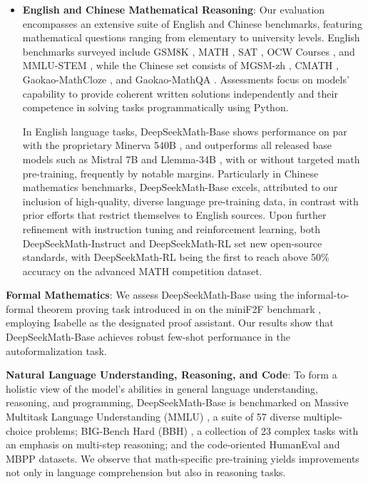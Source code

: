 \begin{itemize}[topsep=0pt]
    \item \textbf{English and Chinese Mathematical Reasoning}: Our evaluation encompasses an extensive suite of English and Chinese benchmarks, featuring mathematical questions ranging from elementary to university levels. English benchmarks surveyed include GSM8K \citep{gsm8k}, MATH \citep{MATH}, SAT \citep{llemma}, OCW Courses \citep{minerva}, and MMLU-STEM \citep{mmlu}, while the Chinese set consists of MGSM-zh \citep{mgsm}, CMATH \citep{wei2023cmath}, Gaokao-MathCloze \citep{agieval}, and Gaokao-MathQA \citep{agieval}. Assessments focus on models' capability to provide coherent written solutions independently and their competence in solving tasks programmatically using Python.

    In English language tasks, DeepSeekMath-Base shows performance on par with the proprietary Minerva 540B \citep{minerva}, and outperforms all released base models such as Mistral 7B \citep{mistral} and Llemma-34B \citep{llemma}, with or without targeted math pre-training, frequently by notable margins. Particularly in Chinese mathematics benchmarks, DeepSeekMath-Base excels, attributed to our inclusion of high-quality, diverse language pre-training data, in contrast with prior efforts \citep{minerva,llemma} that restrict themselves to English sources. Upon further refinement with instruction tuning and reinforcement learning, both DeepSeekMath-Instruct and DeepSeekMath-RL set new open-source standards, with DeepSeekMath-RL being the first to reach above 50\% accuracy on the advanced MATH competition dataset.
\end{itemize}

\item \textbf{Formal Mathematics}: We assess DeepSeekMath-Base using the informal-to-formal theorem proving task introduced in \citep{dsp_proof} on the miniF2F benchmark \citep{minif2f}, employing Isabelle \citep{isabelle} as the designated proof assistant. Our results show that DeepSeekMath-Base achieves robust few-shot performance in the autoformalization task.

\item \textbf{Natural Language Understanding, Reasoning, and Code}: To form a holistic view of the model's abilities in general language understanding, reasoning, and programming, DeepSeekMath-Base is benchmarked on Massive Multitask Language Understanding (MMLU) \citep{mmlu}, a suite of 57 diverse multiple-choice problems; BIG-Bench Hard (BBH) \citep{bbh}, a collection of 23 complex tasks with an emphasis on multi-step reasoning; and the code-oriented HumanEval \citep{codex} and MBPP \citep{mbpp} datasets. We observe that math-specific pre-training yields improvements not only in language comprehension but also in reasoning tasks.

